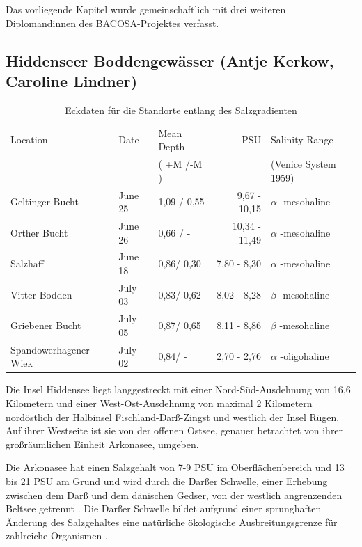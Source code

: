 Das vorliegende Kapitel wurde gemeinschaftlich mit drei weiteren Diplomandinnen des BACOSA-Projektes verfasst.  

\subsection{Hiddenseer Boddengewässer (Antje Kerkow, Caroline Lindner)}

\begin{table}[htb]
\caption{Eckdaten für die Standorte entlang des Salzgradienten}
\begin{tabular}{lllrl}
\toprule
 Location				& Date		& Mean Depth	& PSU 			& Salinity Range   \\
 						& 			& ( +M /-M )	& 				& (Venice System 1959)\\
\midrule
Geltinger Bucht 		& June 25	& 1,09 / 0,55	& 9,67 - 10,15 	& $ \alpha $ -mesohaline\\ 
Orther Bucht			& June 26 	& 0,66 / -		& 10,34 - 11,49 & $ \alpha $ -mesohaline\\
Salzhaff 				& June 18 	& 0,86/ 0,30	& 7,80 - 8,30  	& $ \alpha $ -mesohaline\\
\midrule
Vitter Bodden			& July 03 	& 0,83/ 0,62	& 8,02 - 8,28  	& $ \beta $ -mesohaline\\
Griebener Bucht			& July 05 	& 0,87/ 0,65	& 8,11 - 8,86	& $ \beta $ -mesohaline\\
\midrule
Spandowerhagener Wiek 	& July 02 	& 0,84/ -		& 2,70 - 2,76  	& $ \alpha $ -oligohaline\\
\bottomrule
\end{tabular}
\label{Salztabelle}
\end{table}

Die Insel Hiddensee liegt langgestreckt mit einer Nord-Süd-Ausdehnung von 16,6 Kilometern und einer West-Ost-Ausdehnung von maximal 2 Kilometern nordöstlich der Halbinsel Fischland-Darß-Zingst und westlich der Insel Rügen. Auf ihrer Westseite ist sie von der offenen Ostsee, genauer betrachtet von ihrer großräumlichen Einheit Arkonasee, umgeben.

Die Arkonasee hat einen Salzgehalt von 7-9 PSU im Oberflächenbereich und 13 bis 21 PSU am Grund \citep{iow_2014} und wird durch die Darßer Schwelle, einer Erhebung zwischen dem Darß und dem dänischen Gedser, von der westlich angrenzenden Beltsee getrennt \citep{biele_1997}. Die Darßer Schwelle bildet aufgrund einer sprunghaften Änderung des Salzgehaltes eine natürliche ökologische Ausbreitungsgrenze für zahlreiche Organismen \citep{biele_1997}.

